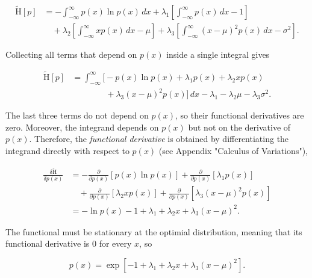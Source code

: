\documentclass[10pt,twocolumn]{memoir}
\begin{document}
\begin{equation}
\begin{aligned}
    \widetilde{\mathrm{H}}[p]
    &=-\int_{-\infty}^{\infty} p(x)\ln p(x)\,dx + \lambda_1\left[\int_{-\infty}^{\infty}p(x)\,dx-1\right] \\
    &\quad
    + \lambda_2\left[\int_{-\infty}^{\infty}xp(x)\,dx-\mu\right]
    + \lambda_3\left[\int_{-\infty}^{\infty}(x-\mu)^2p(x)\,dx-\sigma^2\right].
\end{aligned}
\end{equation}

Collecting all terms that depend on $p(x)$ inside a single integral gives

\begin{equation}
\begin{aligned}
    \widetilde{\mathrm{H}}[p]
    &= \int_{-\infty}^{\infty}\Big[-p(x)\ln p(x) + \lambda_1p(x) + \lambda_2xp(x) \\
    &\qquad\qquad + \lambda_3(x-\mu)^2p(x)\Big]\,dx -\lambda_1-\lambda_2\mu-\lambda_3\sigma^2.
\end{aligned}
\end{equation}

The last three terms do not depend on $p(x)$, so their functional derivatives are zero. Moreover, the integrand depends on $p(x)$ but not on the derivative of $p(x)$. Therefore, the \textit{functional derivative} is obtained by differentiating the integrand directly with respect to $p(x)$ (see Appendix "Calculus of Variations"),

\begin{equation}
\begin{aligned}
    \frac{\delta\widetilde{\mathrm{H}}}{\delta p(x)}
    &=
    -\frac{\partial}{\partial p(x)}\left[p(x)\ln p(x)\right]
    +\frac{\partial}{\partial p(x)}\left[\lambda_1p(x)\right] \\
    &\quad
    +\frac{\partial}{\partial p(x)}\left[\lambda_2xp(x)\right]
    +\frac{\partial}{\partial p(x)}\left[\lambda_3(x-\mu)^2p(x)\right] \\
    &=
    -\ln p(x)-1+\lambda_1+\lambda_2x+\lambda_3(x-\mu)^2.
\end{aligned}
\end{equation}

The functional must be stationary at the optimial distribution, meaning that its functional derivative is 0 for every $x$, so

\begin{equation}
    p(x) = \exp\left[-1+\lambda_1+\lambda_2x+\lambda_3(x-\mu)^2\right].
\end{equation}
\end{document}
